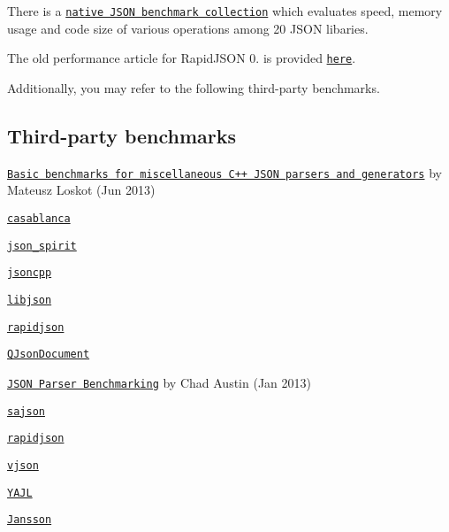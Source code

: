 There is a \href{https://github.com/miloyip/nativejson-benchmark}{\tt native J\+S\+ON benchmark collection} which evaluates speed, memory usage and code size of various operations among 20 J\+S\+ON libaries.

The old performance article for Rapid\+J\+S\+ON 0. is provided \href{https://code.google.com/p/rapidjson/wiki/Performance}{\tt here}.

Additionally, you may refer to the following third-\/party benchmarks.

\subsection*{Third-\/party benchmarks}


\begin{DoxyItemize}
\item \href{https://github.com/mloskot/json_benchmark}{\tt Basic benchmarks for miscellaneous C++ J\+S\+ON parsers and generators} by Mateusz Loskot (Jun 2013)
\begin{DoxyItemize}
\item \href{https://casablanca.codeplex.com/}{\tt casablanca}
\item \href{https://github.com/cierelabs/json_spirit}{\tt json\+\_\+spirit}
\item \href{http://jsoncpp.sourceforge.net/}{\tt jsoncpp}
\item \href{http://sourceforge.net/projects/libjson/}{\tt libjson}
\item \href{https://github.com/miloyip/rapidjson/}{\tt rapidjson}
\item \href{http://qt-project.org/doc/qt-5.0/qtcore/qjsondocument.html}{\tt Q\+Json\+Document}
\end{DoxyItemize}
\item \href{http://chadaustin.me/2013/01/json-parser-benchmarking/}{\tt J\+S\+ON Parser Benchmarking} by Chad Austin (Jan 2013)
\begin{DoxyItemize}
\item \href{https://github.com/chadaustin/sajson}{\tt sajson}
\item \href{https://github.com/miloyip/rapidjson/}{\tt rapidjson}
\item \href{https://code.google.com/p/vjson/}{\tt vjson}
\item \href{http://lloyd.github.com/yajl/}{\tt Y\+A\+JL}
\item \href{http://www.digip.org/jansson/}{\tt Jansson} 
\end{DoxyItemize}
\end{DoxyItemize}